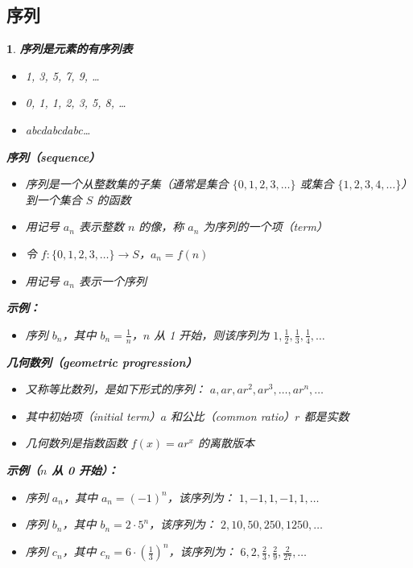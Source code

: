 \documentclass[UTF8]{report}
\theoremstyle{MyLineTheoremStyle} %
\theoremstyle{MyBlockTheoremStyle} %
\theoremstyle{MySubsubsectionStyle} %
\newtheorem{definition}{}
\begin{document}
\subsection{序列}

\begin{definition}
    \textbf{序列是元素的有序列表}\par
    \begin{itemize}
        \item 1, 3, 5, 7, 9, \dots
        \item 0, 1, 1, 2, 3, 5, 8, \dots
        \item abcdabcdabc\dots
    \end{itemize}

    \textbf{序列（sequence）}\par
    \begin{itemize}
        \item 序列是一个从整数集的子集（通常是集合 $\{0,1,2,3, \ldots\}$ 或集合 $\{1,2,3,4, \ldots\}$）到一个集合 $S$ 的函数
        \item 用记号 $a_n$ 表示整数 $n$ 的像，称 $a_n$ 为序列的一个项（term）
        \item 令 $f: \{0,1,2,3, \ldots\} \to S$，$a_n = f(n)$
        \item 用记号 $a_n$ 表示一个序列
    \end{itemize}

    \textbf{示例：}\par
    \begin{itemize}
        \item 序列 $b_n$，其中 $b_n = \frac{1}{n}$，$n$ 从 1 开始，则该序列为 $1, \frac{1}{2}, \frac{1}{3}, \frac{1}{4}, \ldots$
    \end{itemize}
    
    \textbf{几何数列（geometric progression）}\par
    \begin{itemize}
        \item 又称等比数列，是如下形式的序列： $a, ar, ar^2, ar^3, \ldots, ar^n, \ldots$
        \item 其中初始项（initial term）$a$ 和公比（common ratio）$r$ 都是实数
        \item 几何数列是指数函数 $f(x) = ar^x$ 的离散版本
    \end{itemize}
    \textbf{示例（$n$ 从 0 开始）：}\par
    \begin{itemize}
        \item 序列 $a_n$，其中 $a_n = (-1)^n$，该序列为： $1, -1, 1, -1, 1, \ldots$
        \item 序列 $b_n$，其中 $b_n = 2 \cdot 5^n$，该序列为： $2, 10, 50, 250, 1250, \ldots$
        \item 序列 $c_n$，其中 $c_n = 6 \cdot \left(\frac{1}{3}\right)^n$，该序列为： $6, 2, \frac{2}{3}, \frac{2}{9}, \frac{2}{27}, \ldots$
    \end{itemize}


\end{definition}
\end{document}
